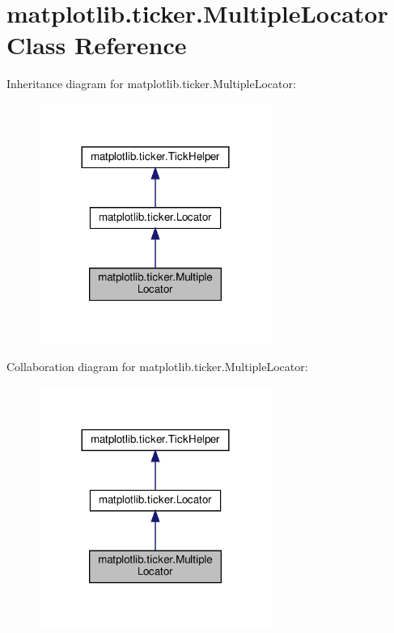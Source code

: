 \hypertarget{classmatplotlib_1_1ticker_1_1MultipleLocator}{}\section{matplotlib.\+ticker.\+Multiple\+Locator Class Reference}
\label{classmatplotlib_1_1ticker_1_1MultipleLocator}


Inheritance diagram for matplotlib.\+ticker.\+Multiple\+Locator\+:
\nopagebreak
\begin{figure}[H]
\begin{center}
\leavevmode
\includegraphics[width=216pt]{classmatplotlib_1_1ticker_1_1MultipleLocator__inherit__graph}
\end{center}
\end{figure}


Collaboration diagram for matplotlib.\+ticker.\+Multiple\+Locator\+:
\nopagebreak
\begin{figure}[H]
\begin{center}
\leavevmode
\includegraphics[width=216pt]{classmatplotlib_1_1ticker_1_1MultipleLocator__coll__graph}
\end{center}
\end{figure}
